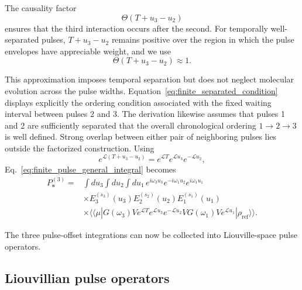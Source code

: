 \documentclass[11pt]{article}
\begin{document}
The causality factor
%
\begin{equation}
\Theta(T+u_3-u_2)
\end{equation}
%
ensures that the third interaction occurs after the second. For
temporally well-separated pulses, $T+u_3-u_2$ remains positive over
the region in which the pulse envelopes have appreciable weight, and
we use
%
\begin{equation}
\boxed{
\Theta(T+u_3-u_2)
\approx1.
}
\label{eq:finite_separated_condition}
\end{equation}

This approximation imposes temporal separation but does not neglect
molecular evolution across the pulse widths.
Equation~\eqref{eq:finite_separated_condition} displays explicitly the
ordering condition associated with the fixed waiting interval between
pulses 2 and 3. The derivation likewise assumes that pulses 1 and 2 are
sufficiently separated that the overall chronological ordering
$1\rightarrow2\rightarrow3$ is well defined. Strong overlap between
either pair of neighboring pulses lies outside the factorized
construction.
Using
%
\begin{equation}
\boxed{
e^{\mathcal{L}(T+u_3-u_2)}
=
e^{\mathcal{L}T}
e^{\mathcal{L}u_3}
e^{-\mathcal{L}u_2},
}
\label{eq:finite_waiting_factorization}
\end{equation}
%
Eq.~\eqref{eq:finite_pulse_general_integral} becomes
%
\begin{align}
P_{\mathbf{s}}^{(3)}
={}&
\int du_3
\int du_2
\int du_1\,
e^{i\omega_3u_3}
e^{-i\omega_1u_2}
e^{i\omega_1u_1}
\nonumber\\
&\times
E_3^{(s_3)}(u_3)
E_2^{(s_2)}(u_2)
E_1^{(s_1)}(u_1)
\nonumber\\
&\times
\langle\!\langle\mu|
G(\omega_3)
V
e^{\mathcal{L}T}
e^{\mathcal{L}u_3}
e^{-\mathcal{L}u_2}
V
G(\omega_1)
V
e^{\mathcal{L}u_1}
|\rho_{\mathrm{ref}}\rangle\rangle .
\label{eq:finite_pulse_factorized}
\end{align}

The three pulse-offset integrations can now be collected into
Liouville-space pulse operators.


\subsection{Liouvillian pulse operators}
\label{subsec:liouvillian_pulse_operators}
\end{document}
